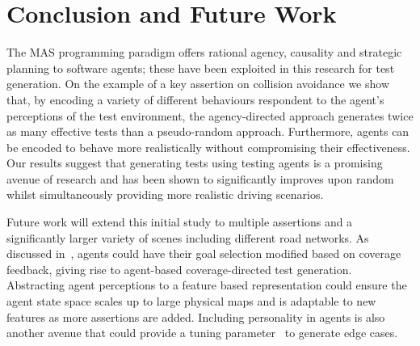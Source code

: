 \documentclass[letterpaper, 10 pt, journal, twoside]{IEEEtran}
\begin{document}
\section{Conclusion and Future Work}\label{s:conclusion}
The MAS programming paradigm offers rational agency, causality and strategic planning to software agents; these have been exploited in this research for test generation. 
%
On the example of a key assertion on collision avoidance we show that, by encoding a variety of different behaviours respondent to the agent's perceptions of the test environment, the agency-directed approach generates twice as many effective tests than a pseudo-random approach. Furthermore, agents can be encoded to behave more realistically without compromising their effectiveness. 
Our results suggest that generating tests using testing agents is a promising avenue of research and has been shown to significantly improves upon random whilst simultaneously providing more realistic driving scenarios.

Future work will extend this initial study to multiple assertions and a significantly larger variety of scenes including different road networks. 
As discussed in~\cite{Eder2007}, agents could have their goal selection modified based on coverage feedback, giving rise to  agent-based coverage-directed test generation. 
%
%
Abstracting agent perceptions to a feature based representation could ensure the agent state space scales up to large physical maps and is adaptable to new features as more assertions are added.
Including personality in agents is also another avenue that could provide a tuning parameter~\cite{Zoumpoulaki2010} to generate edge cases. 
\end{document}
